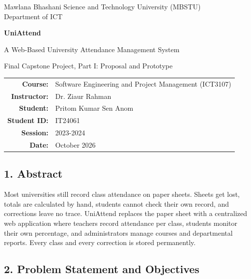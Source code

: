\documentclass[
  11pt,
]{article}
\author{}
\date{}
\begin{document}
\begin{titlepage}
\thispagestyle{empty}\centering
\vspace*{2cm}
{\large Mawlana Bhashani Science and Technology University (MBSTU)\\Department of ICT\par}
\vspace{1.8cm}
{\Huge\bfseries UniAttend\par}
\vspace{0.4cm}
{\Large A Web-Based University Attendance Management System\par}
\vspace{1cm}
{\large Final Capstone Project, Part I: Proposal and Prototype\par}
\vspace{1.8cm}
\begin{tabular}{rl}
\textbf{Course:} & Software Engineering and Project Management (ICT3107)\\
\textbf{Instructor:} & Dr. Ziaur Rahman\\
\textbf{Student:} & Pritom Kumar Sen Anom\\
\textbf{Student ID:} & IT24061\\
\textbf{Session:} & 2023-2024\\
\textbf{Date:} & October 2026
\end{tabular}
\end{titlepage}
\newpage

{
\hypersetup{linkcolor=}
\setcounter{tocdepth}{2}
\tableofcontents
}
\hypertarget{abstract}{%
\subsection{1. Abstract}\label{abstract}}

Most universities still record class attendance on paper sheets. Sheets
get lost, totals are calculated by hand, students cannot check their own
record, and corrections leave no trace. UniAttend replaces the paper
sheet with a centralized web application where teachers record
attendance per class, students monitor their own percentage, and
administrators manage courses and departmental reports. Every class and
every correction is stored permanently.

\hypertarget{problem-statement-and-objectives}{%
\subsection{2. Problem Statement and
Objectives}\label{problem-statement-and-objectives}}
\end{document}
